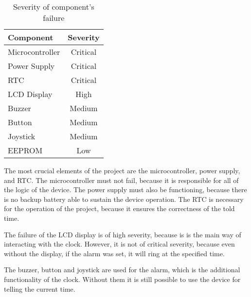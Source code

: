\documentclass[10pt]{article}
\begin{document}
    \begin{table}[H]\centering
        \newcommand{\critical}{\color{red} Critical}
        \begin{tabular}{|l|c|}
            \hline
            \bf Component   &   \bf Severity                \\\hline
            Microcontroller &   \critical                   \\\hline
            Power Supply    &   \critical\footnotemark      \\\hline
            RTC             &   \critical                   \\\hline
            LCD Display     &   High                        \\\hline
            Buzzer          &   Medium                      \\\hline
            Button          &   Medium                      \\\hline
            Joystick        &   Medium                      \\\hline
            EEPROM          &   Low                         \\\hline
        \end{tabular}
        \caption{Severity of component's failure}
    \end{table}

    The most crucial elements of the project are the microcontroller, power supply, and RTC.
    The microcontroller must not fail, because it is responsible for all of the logic of the device.
    The power supply must also be functioning, because there is no backup battery able to sustain the device operation.
    The RTC is necessary for the operation of the project, because it ensures the correctness of the told time.

    The failure of the LCD display is of high severity, because is is the main way of interacting with the clock.
    However, it is not of critical severity, because even without the display, if the alarm was set, it will ring at the specified time.

    The buzzer, button and joystick are used for the alarm, which is the additional functionality of the clock.
    Without them it is still possible to use the device for telling the current time.
\end{document}
